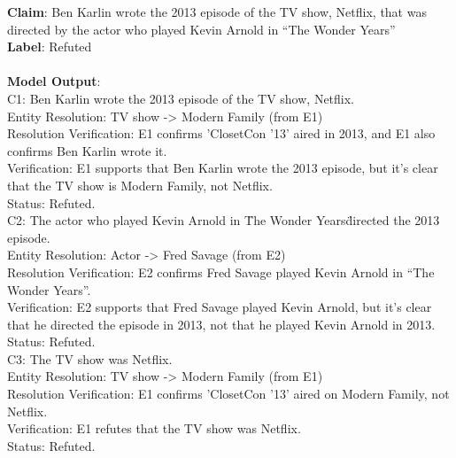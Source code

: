 \small{\begin{casebox}
\textbf{Claim}: Ben Karlin wrote the 2013 episode of the TV show, Netflix, that was directed by the actor who played Kevin Arnold in ``The Wonder Years''\\
\textbf{Label}: Refuted\\\\
\textbf{Model Output}:\\
C1: Ben Karlin wrote the 2013 episode of the TV show, Netflix.\\Entity Resolution: TV show -> Modern Family (from E1)\\Resolution Verification: E1 confirms 'ClosetCon '13' aired in 2013, and E1 also confirms Ben Karlin wrote it.\\Verification: E1 supports that Ben Karlin wrote the 2013 episode, but it's clear that the TV show is Modern Family, not Netflix.\\Status: Refuted.\vspace{1mm}\\C2: The actor who played Kevin Arnold in \"The Wonder Years\" directed the 2013 episode.\\Entity Resolution: Actor -> Fred Savage (from E2)\\Resolution Verification: E2 confirms Fred Savage played Kevin Arnold in ``The Wonder Years''.\\Verification: E2 supports that Fred Savage played Kevin Arnold, but it's clear that he directed the episode in 2013, not that he played Kevin Arnold in 2013.\\Status: Refuted.\vspace{1mm}\\C3: The TV show was Netflix.\\Entity Resolution: TV show -> Modern Family (from E1)\\Resolution Verification: E1 confirms 'ClosetCon '13' aired on Modern Family, not Netflix.\\Verification: E1 refutes that the TV show was Netflix.\\Status: Refuted.
\end{casebox}}

